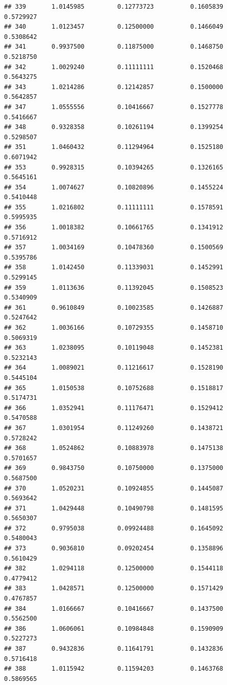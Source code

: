 \documentclass[]{article}
\begin{document}
\begin{verbatim}
## 339       1.0145985         0.12773723          0.1605839        0.5729927
## 340       1.0123457         0.12500000          0.1466049        0.5308642
## 341       0.9937500         0.11875000          0.1468750        0.5218750
## 342       1.0029240         0.11111111          0.1520468        0.5643275
## 343       1.0214286         0.12142857          0.1500000        0.5642857
## 347       1.0555556         0.10416667          0.1527778        0.5416667
## 348       0.9328358         0.10261194          0.1399254        0.5298507
## 351       1.0460432         0.11294964          0.1525180        0.6071942
## 353       0.9928315         0.10394265          0.1326165        0.5645161
## 354       1.0074627         0.10820896          0.1455224        0.5410448
## 355       1.0216802         0.11111111          0.1578591        0.5995935
## 356       1.0018382         0.10661765          0.1341912        0.5716912
## 357       1.0034169         0.10478360          0.1500569        0.5395786
## 358       1.0142450         0.11339031          0.1452991        0.5299145
## 359       1.0113636         0.11392045          0.1508523        0.5340909
## 361       0.9610849         0.10023585          0.1426887        0.5247642
## 362       1.0036166         0.10729355          0.1458710        0.5069319
## 363       1.0238095         0.10119048          0.1452381        0.5232143
## 364       1.0089021         0.11216617          0.1528190        0.5445104
## 365       1.0150538         0.10752688          0.1518817        0.5174731
## 366       1.0352941         0.11176471          0.1529412        0.5470588
## 367       1.0301954         0.11249260          0.1438721        0.5728242
## 368       1.0524862         0.10883978          0.1475138        0.5701657
## 369       0.9843750         0.10750000          0.1375000        0.5687500
## 370       1.0520231         0.10924855          0.1445087        0.5693642
## 371       1.0429448         0.10490798          0.1481595        0.5650307
## 372       0.9795038         0.09924488          0.1645092        0.5480043
## 373       0.9036810         0.09202454          0.1358896        0.5610429
## 382       1.0294118         0.12500000          0.1544118        0.4779412
## 383       1.0428571         0.12500000          0.1571429        0.4767857
## 384       1.0166667         0.10416667          0.1437500        0.5562500
## 386       1.0606061         0.10984848          0.1590909        0.5227273
## 387       0.9432836         0.11641791          0.1432836        0.5716418
## 388       1.0115942         0.11594203          0.1463768        0.5869565

\end{verbatim}
\end{document}

